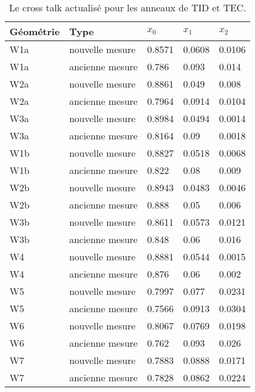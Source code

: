 \begin{table}[h]
\begin{center}
\begin{tabular}{|l|l|l|l|l|}
\hline
Géométrie  & Type & $x_{0}$ & $x_{1}$ & $x_{2}$ \\
\hline
\hline
W1a &  nouvelle mesure & 0.8571 & 0.0608 & 0.0106 \\
W1a &  ancienne mesure & 0.786 & 0.093 & 0.014 \\
\hline
W2a &  nouvelle mesure & 0.8861 & 0.049 & 0.008 \\
W2a &  ancienne mesure & 0.7964 & 0.0914 & 0.0104 \\
\hline
W3a &  nouvelle mesure & 0.8984 & 0.0494 & 0.0014 \\
W3a &  ancienne mesure & 0.8164 & 0.09 & 0.0018 \\
\hline
W1b &  nouvelle mesure & 0.8827 & 0.0518 & 0.0068 \\
W1b &  ancienne mesure & 0.822 & 0.08 & 0.009 \\
\hline
W2b &  nouvelle mesure & 0.8943 & 0.0483 & 0.0046 \\
W2b &  ancienne mesure & 0.888 & 0.05 & 0.006 \\
\hline
W3b &  nouvelle mesure & 0.8611 & 0.0573 & 0.0121 \\
W3b &  ancienne mesure & 0.848 & 0.06 & 0.016 \\
\hline
W4 &  nouvelle mesure & 0.8881 & 0.0544 & 0.0015 \\
W4 &  ancienne mesure & 0.876 & 0.06 & 0.002 \\
\hline
W5 &  nouvelle mesure & 0.7997 & 0.077 & 0.0231 \\
W5 &  ancienne mesure & 0.7566 & 0.0913 & 0.0304 \\
\hline
W6 &  nouvelle mesure & 0.8067 & 0.0769 & 0.0198 \\
W6 &  ancienne mesure & 0.762 & 0.093 & 0.026 \\
\hline
W7 &  nouvelle mesure & 0.7883 & 0.0888 & 0.0171 \\
W7 &  ancienne mesure & 0.7828 & 0.0862 & 0.0224 \\
\hline
\end{tabular}
\caption[Table caption text]{ Le cross talk actualisé pour les anneaux de TID et TEC. }
\label{tab:measuredXtalkTODTEC2}
\end{center}
\end{table}


